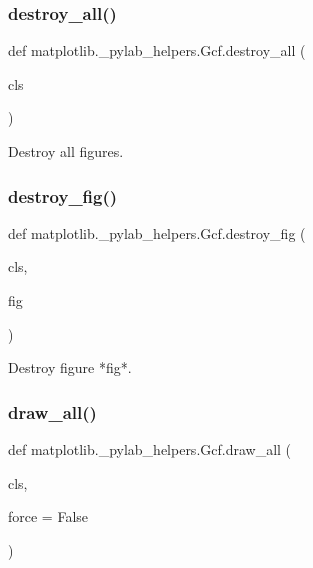 \subsubsection{\texorpdfstring{destroy\+\_\+all()}{destroy\_all()}}
{\footnotesize\ttfamily def matplotlib.\+\_\+pylab\+\_\+helpers.\+Gcf.\+destroy\+\_\+all (\begin{DoxyParamCaption}\item[{}]{cls }\end{DoxyParamCaption})}

\begin{DoxyVerb}Destroy all figures.\end{DoxyVerb}
 \mbox{\label{classmatplotlib_1_1__pylab__helpers_1_1Gcf_abad6184840428b5f61e4189e31b7afca}} 
\subsubsection{\texorpdfstring{destroy\+\_\+fig()}{destroy\_fig()}}
{\footnotesize\ttfamily def matplotlib.\+\_\+pylab\+\_\+helpers.\+Gcf.\+destroy\+\_\+fig (\begin{DoxyParamCaption}\item[{}]{cls,  }\item[{}]{fig }\end{DoxyParamCaption})}

\begin{DoxyVerb}Destroy figure *fig*.\end{DoxyVerb}
 \mbox{\label{classmatplotlib_1_1__pylab__helpers_1_1Gcf_acbced6083e36a464b12764c3785959b7}} 
\subsubsection{\texorpdfstring{draw\+\_\+all()}{draw\_all()}}
{\footnotesize\ttfamily def matplotlib.\+\_\+pylab\+\_\+helpers.\+Gcf.\+draw\+\_\+all (\begin{DoxyParamCaption}\item[{}]{cls,  }\item[{}]{force = {\ttfamily False} }\end{DoxyParamCaption})}

